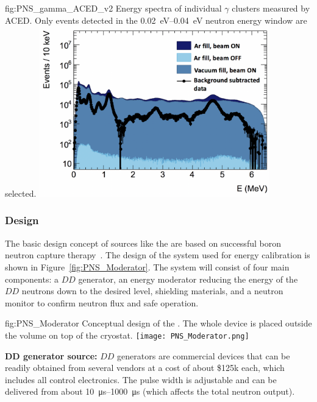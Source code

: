 \begin{dunefigure}{fig:PNS_gamma_ACED_v2}
{Energy spectra of individual $\gamma$ clusters measured by ACED. Only events detected in the \SIrange{0.02}{0.04}{eV} neutron energy window are selected.}
\includegraphics[width=10cm]{graphics/PNS_gamma_ACED_v2.png}
\end{dunefigure}


\subsubsection{Design}
\label{sec:sp-calib-sys-pns-des}

The basic design concept of sources like the  are based on successful boron neutron capture therapy~\cite{bib:Koivunoro2004}. The design of the  system used for energy calibration is shown in Figure~\ref{fig:PNS_Moderator}. The system will consist of four main components: a $DD$ generator, an energy moderator reducing the energy of the $DD$ neutrons down to the desired level, shielding materials, and a neutron monitor to confirm neutron flux and safe operation. 

\begin{dunefigure}{fig:PNS_Moderator}
{Conceptual design of the . The whole device is placed outside the  volume on top of the cryostat.}
\texttt{[image: PNS\_Moderator.png]}
\end{dunefigure}

{\bf DD generator source:} $DD$ generators are commercial devices that can be readily obtained from several vendors at a cost of about \$\num{125}k each, which includes all control electronics. The pulse width is adjustable and can be delivered from about \SIrange{10}{1000}{\micro\s} (which affects the total neutron output). 

